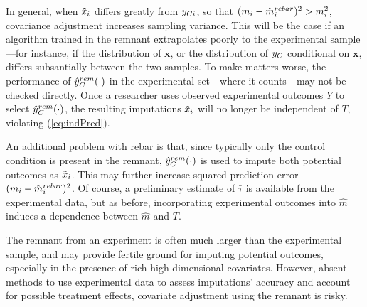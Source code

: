In general, when $\tilde{x}_i$ %
differs greatly from $y_{Ci}$, so that $(m_i-\hat{m}_i^{rebar})^2>m_i^2$, covariance
adjustment increases sampling variance.
This will be the case if an algorithm trained in the remnant
extrapolates poorly to the experimental sample---for instance, if the
distribution of $\bm{x}$, or the distribution of $y_C$
conditional on $\bm{x}$, differs subsantially between the two samples.
To make matters worse, the performance of $\hat{y}_C^{rem}(\cdot)$ in the
experimental set---where it counts---may not be checked directly.
Once a researcher uses observed experimental outcomes $Y$ to select
$\hat{y}_C^{rem}(\cdot)$, the resulting imputations $\tilde{x}_i$
will no longer be independent of $T$, violating
(\ref{eq:indPred}).

An additional problem with rebar is that, since typically only the
control condition is present in the remnant, $\hat{y}_C^{rem}(\cdot)$ is used
to impute both potential outcomes as $\tilde{x}_i$.
This may further increase squared prediction error $(m_i-\hat{m}_i^{rebar})^2$.
Of course, a preliminary estimate of $\bar{\tau}$ is available from
the experimental data, but as before, incorporating experimental
outcomes into $\hat{m}$ induces a dependence between $\hat{m}$ and
$T$.

The remnant from an experiment is often much larger than the
experimental sample, and may provide fertile ground for imputing
potential outcomes, especially in the presence of rich
high-dimensional covariates.
However, absent methods to use experimental data to assess imputations'
accuracy and account for possible treatment effects, covariate
adjustment using the remnant is risky.
